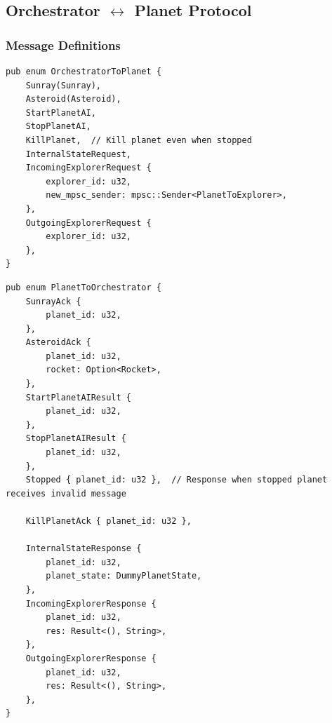 \documentclass[12pt,a4paper]{article}
\begin{document}
\label{sec:message-enums}
\noindent\begin{minipage}{\textwidth}
\subsection{Orchestrator $\leftrightarrow$ Planet Protocol}
\label{subsec:orch-planet-enums}
\vspace{-5pt}
\subsubsection{Message Definitions}

\begin{lstlisting}[style=rustcool, caption={Orchestrator to Planet Messages}, label=lst:orch-to-planet]
pub enum OrchestratorToPlanet {
    Sunray(Sunray),
    Asteroid(Asteroid),
    StartPlanetAI,
    StopPlanetAI,
    KillPlanet,  // Kill planet even when stopped
    InternalStateRequest,
    IncomingExplorerRequest {
        explorer_id: u32,
        new_mpsc_sender: mpsc::Sender<PlanetToExplorer>,
    },
    OutgoingExplorerRequest {
        explorer_id: u32,
    },
}
\end{lstlisting}

\vspace{-5pt}
 
\begin{lstlisting}[style=rustcool, caption={Planet to Orchestrator Messages}, label=lst:planet-to-orch]
pub enum PlanetToOrchestrator {
    SunrayAck {
        planet_id: u32,
    },
    AsteroidAck {
        planet_id: u32,
        rocket: Option<Rocket>,  
    },
    StartPlanetAIResult {
        planet_id: u32,
    },
    StopPlanetAIResult {
        planet_id: u32,
    },
    Stopped { planet_id: u32 },  // Response when stopped planet receives invalid message
    
    KillPlanetAck { planet_id: u32 },  
    
    InternalStateResponse {
        planet_id: u32,
        planet_state: DummyPlanetState,
    },
    IncomingExplorerResponse {
        planet_id: u32,
        res: Result<(), String>,
    },
    OutgoingExplorerResponse {
        planet_id: u32,
        res: Result<(), String>,
    },
}
\end{lstlisting}
\end{minipage}
\end{document}
